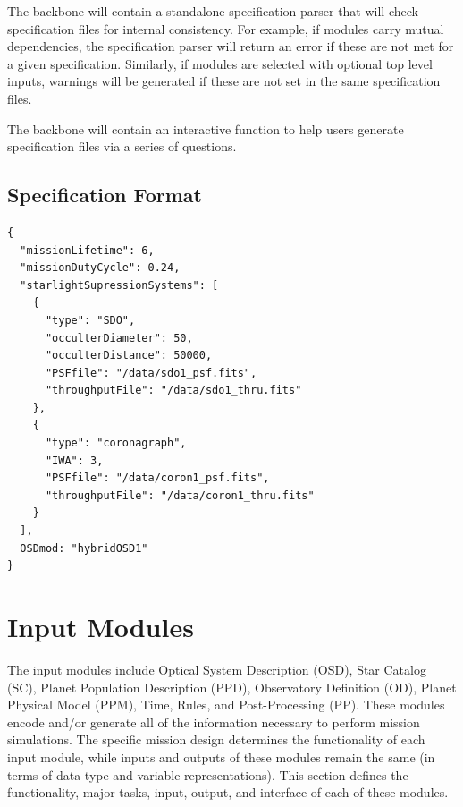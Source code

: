 \documentclass[cleanfoot]{asme2ej}
\begin{document}
The backbone will contain a standalone specification parser that will check specification files for internal consistency.  For example, if modules carry mutual dependencies, the specification parser will return an error if these are not met for a given specification.  Similarly, if modules are selected with optional top level inputs, warnings will be generated if these are not set in the same specification files.

The backbone will contain an interactive function to help users generate specification files via a series of questions.

\subsection{Specification Format}
\begin{verbatim}
{
  "missionLifetime": 6,
  "missionDutyCycle": 0.24,
  "starlightSupressionSystems": [
    {
      "type": "SDO",
      "occulterDiameter": 50,
      "occulterDistance": 50000,
      "PSFfile": "/data/sdo1_psf.fits",
      "throughputFile": "/data/sdo1_thru.fits"
    },
    {
      "type": "coronagraph",
      "IWA": 3,
      "PSFfile": "/data/coron1_psf.fits",
      "throughputFile": "/data/coron1_thru.fits"
    }
  ],
  OSDmod: "hybridOSD1"
}
\end{verbatim}


\section{Input Modules}\label{sec:modules}
The input modules include Optical System Description (OSD), Star Catalog (SC), Planet Population Description (PPD), Observatory Definition (OD), Planet Physical Model (PPM), Time, Rules, and Post-Processing (PP).  These modules encode and/or generate all of the information necessary to perform mission simulations.  The specific mission design determines the functionality of each input module, while inputs and outputs of these modules remain the same (in terms of data type and variable representations).  This section defines the functionality, major tasks, input, output, and interface of each of these modules.

\end{document}
